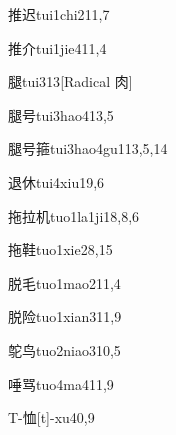 \begin{verbete}{推迟}{tui1chi2}{11,7}
\end{verbete}

\begin{verbete}{推介}{tui1jie4}{11,4}
\end{verbete}

\begin{verbete}{腿}{tui3}{13}[Radical 肉]
\end{verbete}

\begin{verbete}{腿号}{tui3hao4}{13,5}
\end{verbete}

\begin{verbete}{腿号箍}{tui3hao4gu1}{13,5,14}
\end{verbete}

\begin{verbete}{退休}{tui4xiu1}{9,6}
\end{verbete}

\begin{verbete}{拖拉机}{tuo1la1ji1}{8,8,6}
\end{verbete}

\begin{verbete}{拖鞋}{tuo1xie2}{8,15}
\end{verbete}

\begin{verbete}{脱毛}{tuo1mao2}{11,4}
\end{verbete}

\begin{verbete}{脱险}{tuo1xian3}{11,9}
\end{verbete}

\begin{verbete}{鸵鸟}{tuo2niao3}{10,5}
\end{verbete}

\begin{verbete}{唾骂}{tuo4ma4}{11,9}
\end{verbete}

\begin{verbete}{T-恤}{[t]-xu4}{0,9}
\end{verbete}

